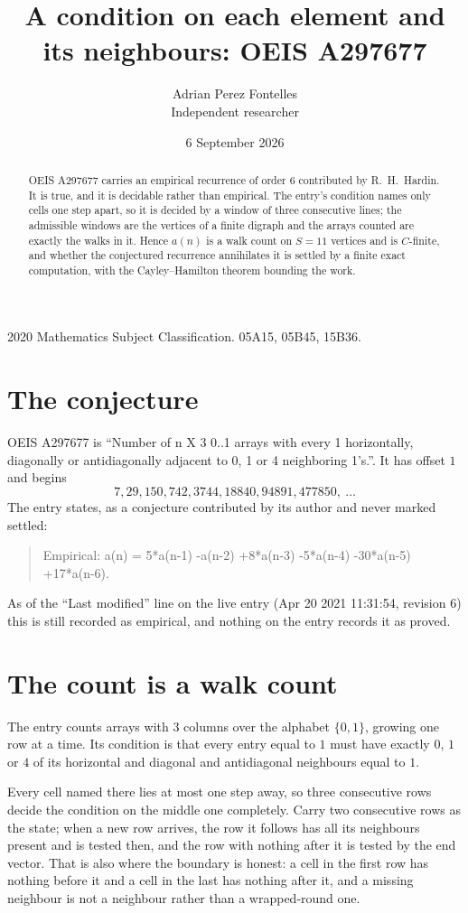 \documentclass[11pt,a4paper]{article}
\title{A condition on each element and its neighbours: OEIS A297677}
\author{Adrian Perez Fontelles\\ \small Independent researcher}
\date{6 September 2026}
\theoremstyle{plain}
\theoremstyle{definition}
\begin{document}
\maketitle

\begin{abstract}
OEIS A297677 carries an empirical recurrence of order $6$ contributed by R.~H.~Hardin. It is
true, and it is decidable rather than empirical. The entry's condition names only cells one step apart, so it is decided by a window of
three consecutive lines; the
admissible windows are the vertices of a finite digraph and the arrays counted are exactly the
walks in it. Hence $a(n)$ is a walk count on $S=11$ vertices and is $C$-finite, and whether the
conjectured recurrence annihilates it is settled by a finite exact computation, with the
Cayley--Hamilton theorem bounding the work.
\end{abstract}

\noindent\small 2020 Mathematics Subject Classification. 05A15, 05B45, 15B36.\normalsize

\section{The conjecture}

OEIS A297677 is ``Number of n X 3 0..1 arrays with every 1 horizontally, diagonally or antidiagonally adjacent to 0, 1 or 4 neighboring 1's.''. It has offset $1$ and begins
\[
7, 29, 150, 742, 3744, 18840, 94891, 477850,\ \dots
\]
The entry states, as a conjecture contributed by its author and never marked settled:
\begin{quote}
Empirical: a(n) = 5*a(n-1) -a(n-2) +8*a(n-3) -5*a(n-4) -30*a(n-5) +17*a(n-6).
\end{quote}
As of the ``Last modified'' line on the live entry (Apr 20 2021 11:31:54, revision 6) this is still
recorded as empirical, and nothing on the entry records it as proved.

\section{The count is a walk count}

The entry counts arrays with $3$ columns over the alphabet $\{0,1\}$, growing one row at a time. Its condition is that every entry equal to $1$ must have exactly $0$, $1$ or $4$ of its horizontal and diagonal and antidiagonal neighbours equal to $1$.

Every cell named there lies at most one step away, so three consecutive rows decide the condition on the middle one completely. Carry two consecutive rows as the state; when a new row arrives, the row it follows has all its neighbours present and is tested then, and the row with nothing after it is tested by the end vector. That is also where the boundary is honest: a cell in the first row has nothing before it and a cell in the last has nothing after it, and a missing neighbour is not a neighbour rather than a wrapped-round one.
\end{document}
